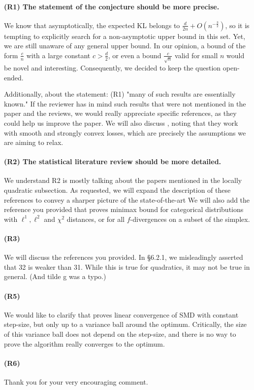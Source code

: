 \paragraph{(R1) The statement of the conjecture should be more precise.}
We know that asymptotically, the expected KL belongs to $\frac{d}{2 n} + O (n^{-\frac{3}{2}})$, so it is tempting to explicitly search for a non-asymptotic upper bound in this set. 
Yet, we are still unaware of any general upper bound.
In our opinion, a bound of the form $\frac{c}{n}$ with a large constant $c>\frac{d}{2}$, or even a bound $\frac{c}{\sqrt{n}}$ valid for small $n$ would be novel and interesting.
Consequently, we decided to keep the question open-ended.  

Additionally, about the statement: (R1) "many of such results are essentially known."
If the reviewer has in mind such results that were not mentioned in the paper and the reviews, we would really appreciate specific references, as they could help us improve the paper.
We will also discuss \citet{frostig2015competing}, noting that they work with smooth and strongly convex losses, which are precisely the assumptions we are aiming to relax.

\paragraph{(R2) The statistical literature review should be more detailed.}
We understand R2 is mostly talking about the papers mentioned in the locally quadratic subsection. 
As requested, we will expand the description of these references to convey a sharper picture of the state-of-the-art
We will also add the reference you provided that proves minimax bound for categorical distributions with $\ell^1, \ell^2$ and $\chi^2$ distances, or for all $f$-divergences on a subset of the simplex. 

\paragraph{(R3)} We will discuss the references you provided. In \S6.2.1, we misleadingly asserted that 32 is weaker than 31. While this is true for quadratics, it may not be true in general. (And tilde g was a typo.)

\paragraph{(R5)} We would like to clarify that \citet{dorazio2021stochastic} proves linear convergence of SMD with constant step-size, but only up to a variance ball around the optimum.
Critically, the size of this variance ball does not depend on the step-size, and there is no way to prove the algorithm really converges to the optimum. 

\paragraph{(R6)} 
Thank you for your very encouraging comment.



